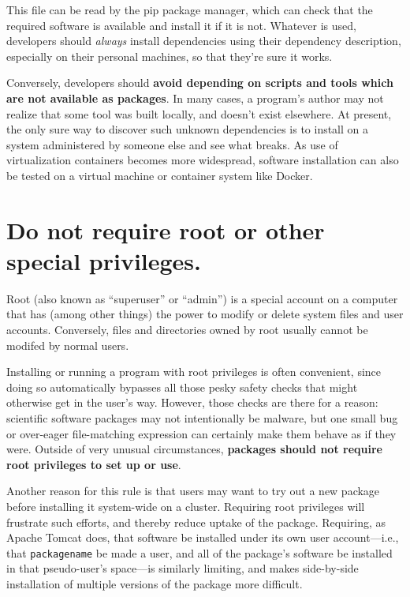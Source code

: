 \documentclass[10pt,letterpaper]{article}
\begin{document}
This file can be read by the pip package manager, which can check that the
required software is available and install it if it is not. 
Whatever is used,
developers should \emph{always} install dependencies
using their dependency description, especially on their personal machines, so that
they're sure it works.

Conversely, developers should
\textbf{avoid depending on scripts and tools which are not available as packages}.
In many cases, a program's author may not realize that some tool was built locally, and
doesn't exist elsewhere. At present, the only sure way to discover such
unknown dependencies is to install on a system administered by someone
else and see what breaks. As use of virtualization containers becomes more
widespread, software installation can also be tested on a virtual machine or
container system like Docker.

\section{Do not require root or other special privileges.}

Root (also known as ``superuser'' or ``admin'') is a special account on
a computer that has (among other things) the power to modify or delete
system files and user accounts. Conversely, files and directories owned
by root usually cannot be modifed by normal users.

Installing or running a program with root privileges is often
convenient, since doing so automatically bypasses all those pesky safety
checks that might otherwise get in the user's way. However, those checks
are there for a reason: scientific software packages may not
intentionally be malware, but one small bug or over-eager file-matching
expression can certainly make them behave as if they were. Outside of
very unusual circumstances,
\textbf{packages should not require root privileges to set up or use}.

Another reason for this rule is that users may want to try out a new
package before installing it system-wide on a cluster. Requiring root
privileges will frustrate such efforts, and thereby reduce uptake of the
package. Requiring, as Apache Tomcat does, that software be installed
under its own user account---i.e.,
that \texttt{packagename} be made a user, and all of the
package's software be installed in that pseudo-user's space---is similarly limiting,
and makes side-by-side installation of multiple versions of
the package more difficult.
\end{document}
